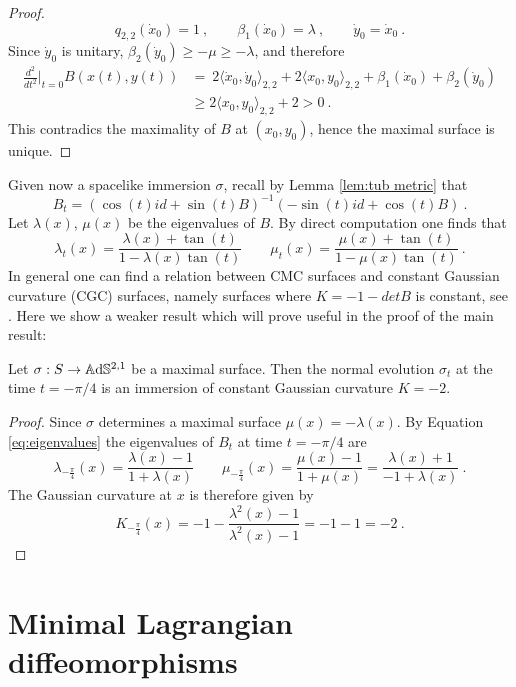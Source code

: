 \begin{proof}
    \[
        q_{2,2}(\dot{x}_0) = 1 \ , \qquad \beta_1(\dot{x}_0)= \lambda \ , \qquad \dot{y}_0=\dot{x}_0 \ .
    \] 
    Since $\dot{y}_0$ is unitary, $\beta_2(\dot{y}_0) \geq - \mu \geq -\lambda$, and therefore
    \[
    \begin{split}
        \frac{d^2}{dt^2}\Big|_{t=0} B(x(t),y(t)) & = \ 2\langle \dot{x}_0, \dot{y}_0 \rangle_{2,2} + 2\langle x_0, y_0 \rangle_{2,2} + \beta_1(\dot{x}_0) + \beta_2(\dot{y}_0) \\
        & \geq 2\langle x_0, y_0 \rangle_{2,2} + 2 > 0 \ .
    \end{split}
    \]
    This contradics the maximality of $B$ at $(x_0,y_0)$, hence the maximal surface is unique.
\end{proof}
Given now a spacelike immersion $\sigma$, recall by Lemma \ref{lem:tub metric} that
\[
    B_t = (\cos(t) id + \sin(t) B)^{-1}(-\sin(t) id + \cos(t) B) \ .
\]
Let $\lambda(x)$, $\mu(x)$ be the eigenvalues of $B$. By direct computation one finds that
\begin{equation} \label{eq:eigenvalues}
    \lambda_t(x) = \frac{\lambda(x)+\tan(t)}{1- \lambda(x)\tan(t)} \qquad \mu_t(x) = \frac{\mu(x)+\tan(t)}{1- \mu(x)\tan(t)} \ .
\end{equation}
In general one can find a relation between CMC surfaces and constant Gaussian curvature (CGC) surfaces, namely surfaces where $K = -1 - detB$ is constant, see \cite{chen2017constantmeancurvaturefoliation}. Here we show a weaker result which will prove useful in the proof of the main result:
\begin{proposition} \label{prop:cmc to cgc}
    Let $\sigma: S \to\mathbb{A}\mathrm{d}\mathbb{S}^{2,1}$ be a maximal surface. Then the normal evolution $\sigma_{t}$ at the time $t= -\pi / 4$ is an immersion of constant Gaussian curvature $K = -2$.
\end{proposition}
\begin{proof}
    Since $\sigma$ determines a maximal surface $\mu(x) = - \lambda(x)$. By Equation \ref{eq:eigenvalues} the eigenvalues of $B_t$ at time $t=-\pi / 4$ are
    \[
        \lambda_{-\frac{\pi}{4}}(x) = \frac{\lambda(x) -1}{1 +\lambda(x)} \qquad \mu_{-\frac{\pi}{4}}(x) = \frac{\mu(x)-1}{1 + \mu(x)} = \frac{\lambda(x) + 1}{-1 + \lambda(x)} \ .
    \]
    The Gaussian curvature at $x$ is therefore given by
    \[
        K_{-\frac{\pi}{4}}(x) = - 1 - \frac{ \lambda^2(x) -1}{ \lambda^2(x) -1 } = -1 -1 = -2 \ .
    \]
\end{proof}

\section{Minimal Lagrangian diffeomorphisms}

